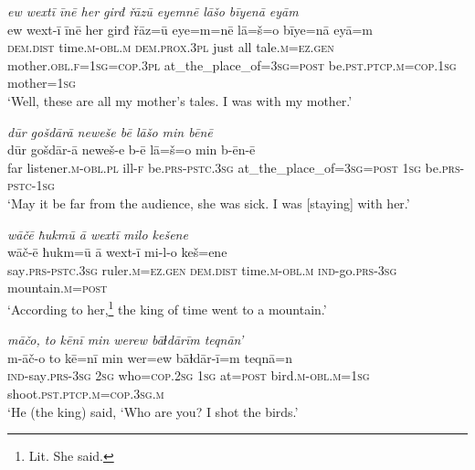 \ea \label{KŠ.1}
\textit{ew wextī īnē her girđ řāzū eyemnē lāšo bīyenā eyām} \\ 
\gll ew wext-ī īnē her girđ řāz=ū eye=m=nē lā=š=o bīye=nā eyā=m \\ 
 \textsc{dem.dist} time\textsc{.m}\textsc{-obl}\textsc{.m} \textsc{dem.prox}\textsc{.3pl} just all tale\textsc{.m}\textsc{=ez.gen} mother\textsc{.obl}\textsc{.f}\textsc{=\textsc{1sg}}\textsc{=cop}\textsc{.3pl} at\_the\_place\_of\textsc{=3sg}\textsc{=\textsc{post}} be\textsc{.pst}\textsc{.ptcp}\textsc{.m}\textsc{=cop}\textsc{.\textsc{1sg}} mother\textsc{=\textsc{1sg}} \\ 
\glt `Well, these are all my mother’s tales. I was with my mother.'
\z 
 
\ea \label{KŠ.2}
\textit{dūr gošdārā neweše bē lāšo min bēnē} \\ 
\gll dūr gošdār-ā neweš-e b-ē lā=š=o min b-ēn-ē \\ 
 far listener\textsc{.m}\textsc{-obl}\textsc{.pl} ill\textsc{-f} be\textsc{.prs}\textsc{-pstc}\textsc{.3sg} at\_the\_place\_of\textsc{=3sg}\textsc{=\textsc{post}} \textsc{1sg} be\textsc{.prs}\textsc{-pstc}\textsc{-\textsc{1sg}} \\ 
\glt `May it be far from the audience, she was sick. I was [staying] with her.'
\z 
 
\ea \label{KŠ.3}
\textit{wāčē ħukmū ā wextī milo kešene} \\ 
\gll wāč-ē ħukm=ū ā wext-ī mi-l-o keš=ene \\ 
 say\textsc{.prs}\textsc{-pstc}\textsc{.3sg} ruler\textsc{.m}\textsc{=ez.gen} \textsc{dem.dist} time\textsc{.m}\textsc{-obl}\textsc{.m} \textsc{ind-}go\textsc{.prs}\textsc{-3sg} mountain\textsc{.m}\textsc{=\textsc{post}} \\ 
\glt `According to her,\footnote{Lit. She said.} the king of time went to a mountain.'
\z 
 
\ea \label{KŠ.10}
\textit{māčo, to kēnī min werew bāɫdārīm teqnān’} \\ 
\gll m-āč-o to kē=nī min wer=ew bāɫdār-ī=m teqnā=n \\ 
 \textsc{ind-}say\textsc{.prs}\textsc{-3sg} \textsc{2sg} who\textsc{=cop}\textsc{.\textsc{2sg}} \textsc{1sg} at\textsc{=\textsc{post}} bird\textsc{.m}\textsc{-obl}\textsc{.m}\textsc{=\textsc{1sg}} shoot\textsc{.pst}\textsc{.ptcp}\textsc{.m}\textsc{=cop}\textsc{.3sg}\textsc{.m} \\ 
\glt `He (the king) said, ‘Who are you? I shot the birds.'
\z 
 
